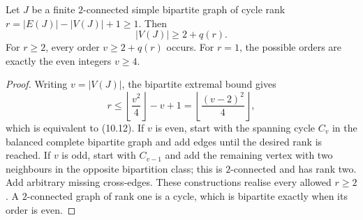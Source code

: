 \begin{lemma}
\label{lemma-minimum-order-fixed-cyclic-rank}
Let $J$ be a finite $2$-connected simple bipartite graph of cycle rank
$r=|E(J)|-|V(J)|+1\ge1$.  Then
\[
|V(J)|\ge 2+q(r).
\tag{10.12}
\]
For $r\ge2$, every order $v\ge2+q(r)$ occurs.  For $r=1$, the possible orders
are exactly the even integers $v\ge4$.
\end{lemma}
\begin{proof}
Writing $v=|V(J)|$, the bipartite extremal bound gives
\[
r\le\left\lfloor\frac{v^2}{4}\right\rfloor-v+1
 =\left\lfloor\frac{(v-2)^2}{4}\right\rfloor,
\]
which is equivalent to (10.12).  If $v$ is even, start with the spanning cycle
$C_v$ in the balanced complete bipartite graph and add edges until the desired
rank is reached.  If $v$ is odd, start with $C_{v-1}$ and add the remaining
vertex with two neighbours in the opposite bipartition class; this is
$2$-connected and has rank two.  Add arbitrary missing cross-edges.  These
constructions realise every allowed $r\ge2$.  A $2$-connected graph of rank one
is a cycle, which is bipartite exactly when its order is even.
\end{proof}

